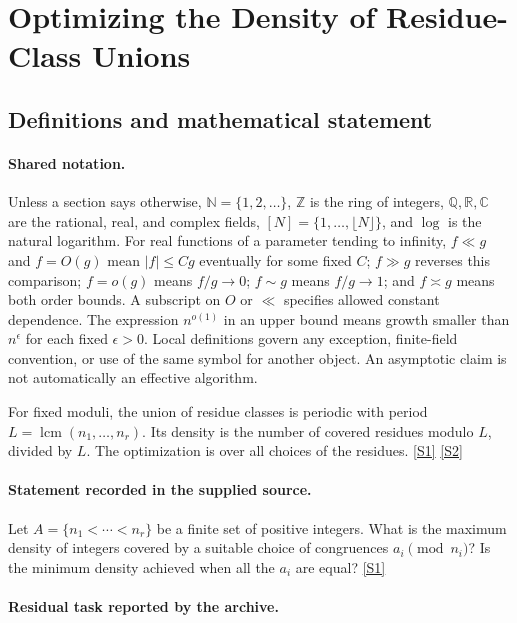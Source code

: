 \documentclass[11pt,a4paper]{article}
\newcommand{\N}{\mathbb{N}}
\newcommand{\Z}{\mathbb{Z}}
\newcommand{\Q}{\mathbb{Q}}
\newcommand{\R}{\mathbb{R}}
\newcommand{\C}{\mathbb{C}}
\newcommand{\sref}[2]{\hyperlink{source:#1:#2}{[S#2]}}
\begin{document}
\section{Optimizing the Density of Residue-Class Unions}\label{statement}


\subsection{Definitions and mathematical statement}

\paragraph{Shared notation.}Unless a section says otherwise, $\N=\{1,2,\ldots\}$,
$\Z$ is the ring of integers, $\Q,\R,\C$ are the rational, real, and complex
fields, $[N]=\{1,\ldots,\lfloor N\rfloor\}$, and $\log$ is the natural
logarithm. For real functions of a parameter tending to infinity,
$f\ll g$ and $f=O(g)$ mean $|f|\leq Cg$ eventually for some fixed $C$;
$f\gg g$ reverses this comparison; $f=o(g)$ means $f/g\to0$;
$f\sim g$ means $f/g\to1$; and $f\asymp g$ means both order bounds.
A subscript on $O$ or $\ll$ specifies allowed constant dependence.
The expression $n^{o(1)}$ in an upper bound means growth smaller than
$n^\epsilon$ for each fixed $\epsilon>0$. Local definitions govern any
exception, finite-field convention, or use of the same symbol for another
object. An asymptotic claim is not automatically an effective algorithm.



For fixed moduli, the union of residue classes is periodic with period $L=\operatorname{lcm}(n_1,\ldots,n_r)$. Its density is the number of covered residues modulo $L$, divided by $L$. The optimization is over all choices of the residues. \sref{statement}{1} \sref{statement}{2}

\paragraph{Statement recorded in the supplied source.}
Let $A=\{n_1<\cdots<n_r\}$ be a finite set of positive integers. What is the maximum density of integers covered by a suitable choice of congruences $a_i\pmod{n_i}$?
Is the minimum density achieved when all the $a_i$ are equal? \sref{statement}{1}

\paragraph{Residual task reported by the archive.}
\end{document}

